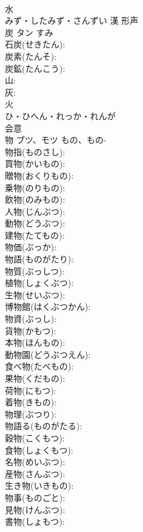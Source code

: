 \documentclass[8pt]{extreport}
\begin{document}
\begin{CJK}{UTF8}{min}
\\	水	
\\	みず・したみず・さんずい	漢	形声 
\\	炭	タン	すみ		
\\	石炭(せきたん): 
\\	炭素(たんそ): 
\\	炭鉱(たんこう): 
\\	山: 
\\	灰: 
\\	火	
\\	ひ・ひへん・れっか・れんが	
\\	会意 
\\	物	ブツ、モツ	もの、もの-		
\\	物指(ものさし): 
\\	買物(かいもの): 
\\	贈物(おくりもの): 
\\	乗物(のりもの): 
\\	飲物(のみもの): 
\\	人物(じんぶつ): 
\\	動物(どうぶつ): 
\\	建物(たてもの): 
\\	物価(ぶっか): 
\\	物語(ものがたり): 
\\	物質(ぶっしつ): 
\\	植物(しょくぶつ): 
\\	生物(せいぶつ): 
\\	博物館(はくぶつかん): 
\\	物資(ぶっし): 
\\	貨物(かもつ): 
\\	本物(ほんもの): 
\\	動物園(どうぶつえん): 
\\	食べ物(たべもの): 
\\	果物(くだもの): 
\\	荷物(にもつ): 
\\	着物(きもの): 
\\	物理(ぶつり): 
\\	物語る(ものがたる): 
\\	穀物(こくもつ): 
\\	食物(しょくもつ): 
\\	名物(めいぶつ): 
\\	産物(さんぶつ): 
\\	生き物(いきもの): 
\\	物事(ものごと): 
\\	見物(けんぶつ): 
\\	書物(しょもつ): 

\end{CJK}
\end{document}
